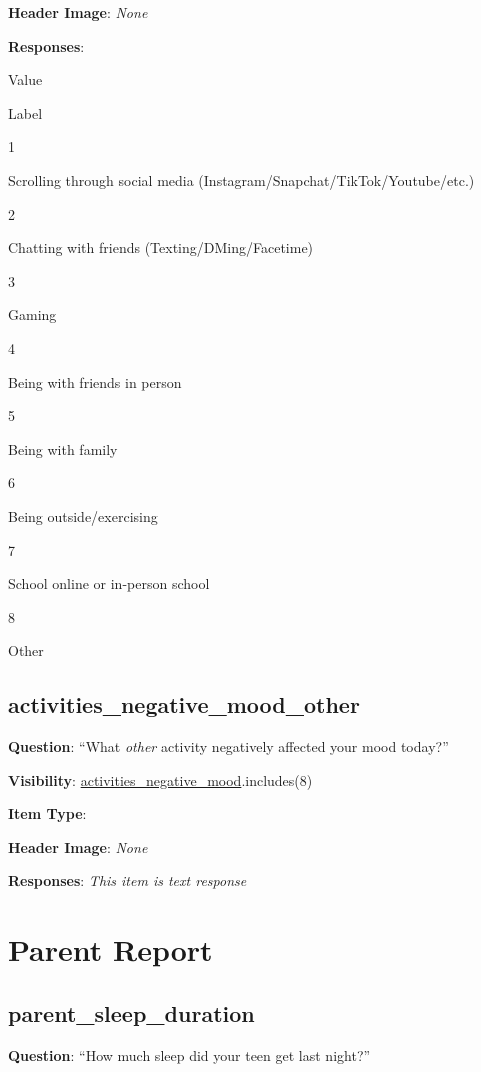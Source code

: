 \documentclass[]{book}
\begin{document}
\textbf{Header Image}: \emph{None}

\textbf{Responses}:

Value

Label

1

Scrolling through social media (Instagram/Snapchat/TikTok/Youtube/etc.)

2

Chatting with friends (Texting/DMing/Facetime)

3

Gaming

4

Being with friends in person

5

Being with family

6

Being outside/exercising

7

School online or in-person school

8

Other

\hypertarget{activities_negative_mood_other}{%
\section{activities\_negative\_mood\_other}\label{activities_negative_mood_other}}

\textbf{Question}: ``What \emph{other} activity negatively affected your mood today?''

\textbf{Visibility}: \protect\hyperlink{activities_negative_mood}{activities\_negative\_mood}.includes(8)

\textbf{Item Type}:

\textbf{Header Image}: \emph{None}

\textbf{Responses}: \emph{This item is text response}

\hypertarget{morning_section}{%
\chapter{Parent Report}\label{morning_section}}

\hypertarget{parent_sleep_duration}{%
\section{parent\_sleep\_duration}\label{parent_sleep_duration}}

\textbf{Question}: ``How much sleep did your teen get last night?''
\end{document}
